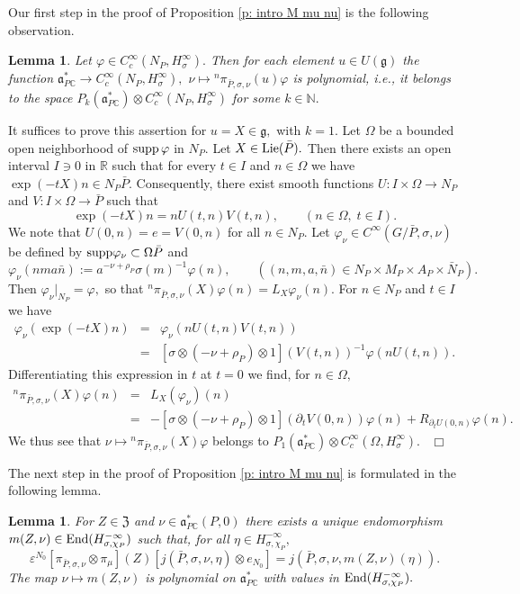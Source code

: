 \documentclass[12pt,a4paper]{article}
\newtheorem{Lemma}[Thm]{Lemma}
\newenvironment{lemma}[0]{\begin{Lemma}\noindent}%
{\end{Lemma}}
\def\proof{\par\noindent{\it Proof.}{\ }{\ }}
\def\qed{~\hfill\hbox{$\Box$}\medbreak}
\def\qquad{\quad\quad}
\def\msy#1{{\mathbb #1}}
\def\C{{\msy C}}
\def\N{{\msy N}}
\def\R{{\msy R}}
\def\ge{\varepsilon}
\def\gf{\varphi}
\def\gs{\sigma}
\def\got#1{\mathfrak #1}
\def\fa{{\got a}}
\def\fg{{\got g}}
\def\to{\rightarrow}
\def\End{{\rm End}}
\def\iC{{\scriptscriptstyle \C}}
\numberwithin{Thm}{section}
\numberwithin{equation}{section}
\def\supp{{\rm supp}}
\def\fZ{{\mathfrak Z}}
\def\faPdc{{\fa_{P\iC}^*}}
\numberwithin{equation}{section}
\def\fZ{{\mathfrak Z}}
\def\faPdc{\fa_{P\iC}^*}
\def\cchi{\chi}
\begin{document}
Our first step in the proof of Proposition \ref{p: intro M mu nu} is the following observation.
\begin{lemma}
\label{l: pol dep for Ccinfty}
Let $\gf \in C_c^\infty(N_P, H_\gs^\infty).$ Then for  each element $u \in U(\fg)$ the function $\faPdc \to C^\infty_c(N_P, H_\gs^\infty),$ 
$\nu \mapsto  {}^n \pi_{\bar P, \gs, \nu}(u) \gf$ is polynomial, i.e., it belongs to the space
$P_k(\faPdc) \otimes C^\infty_c(N_P, H_\gs^\infty)$ for some $k \in \N.$ 
\end{lemma}
\proof
It suffices to prove this assertion for $u = X  \in \fg,$ with $k=1.$ 
Let $\Omega $ be a bounded open neighborhood of $\supp\, \gf$ in $N_P.$ 
Let $X \in {\rm Lie}(\bar P).$ Then there exists an open interval $I \ni 0$ in $\R$ 
such that for every $t \in I$ and $n \in \Omega$ we have $ \exp (-tX)n  \in N_P \bar P.$ 
Consequently, there exist smooth functions $U: I\times \Omega \to N_P$ and 
$V: I\times \Omega \to \bar P$ 
such that
$$ 
\exp(-tX) n =  n U(t,n) V(t,n), \qquad (n \in \Omega,\; t \in I).
$$ 
%
We note that $U(0,n) = e = V(0,n)$ for all $n \in N_P.$ 
Let $\gf_\nu \in  C^\infty(G/\bar P, \gs, \nu)$ be defined by $\supp \gf_\nu \subset \Omega \bar P$ 
and 
$$ 
\gf_\nu(n m a\bar n) := a^{-\nu + \rho_P} \gs(m)^{-1} \gf(n),\qquad ((n, m, a, \bar n ) \in N_P \times M_P \times A_P \times\bar N_P).
$$
Then $\gf_\nu|_{N_P} = \gf,$ so that ${}^n \pi_{\bar P, \gs, \nu}(X) \gf(n) = L_X \gf_\nu(n).$ 
For $n \in N_P$ and $t \in I$ we have
\begin{eqnarray*} 
\gf_\nu(\exp (- tX) n) & = & \gf_\nu( n U(t,n) V(t,n)) \\
&=&  [\gs \otimes (-\nu + \rho_P) \otimes 1](V(t,n))^{-1} \gf(n U(t,n )).
\end{eqnarray*} 
Differentiating this expression in $t$ at $t =0$ we find, for $n \in \Omega,$
\begin{eqnarray*}
{}^n \pi_{\bar P, \gs, \nu}(X) \gf(n) &= &
L_X(\gf_\nu)(n) \\
& = & - [\gs \otimes (-\nu + \rho_P) \otimes 1](\partial_t V(0,n))\gf(n)
+ R_{\partial_t U(0,n)}\gf (n).
\end{eqnarray*} 
We thus see that $\nu \mapsto {}^n \pi_{\bar P, \gs, \nu}(X) \gf$ belongs to $P_1(\faPdc) \otimes C^\infty_c(\Omega, H_\gs^\infty).$ 
\qed

The next step in the proof of Proposition \ref{p: intro M mu nu} is formulated 
in the following lemma.

\begin{lemma}
\label{l: intro m Z nu}
For $Z \in \fZ$ and $\nu \in \faPdc(P,0)$ there exists 
a unique endomorphism $m(Z ,\nu) \in \End(H_{\gs,\cchi_P}^{-\infty})$ such that,
for all $\eta \in H_{\gs,\cchi_P}^{-\infty },$ 
\begin{equation}
\label{e: m Z mu}
\ge^{N_0} [\pi_{\bar P, \gs, \nu}  \otimes \pi_\mu](Z) [j(\bar P,\gs,\nu, \eta) \otimes e_{N_0}]  = 
j(\bar P,\gs,\nu ,m(Z, \nu)(\eta)).
\end{equation}
The map $\nu \mapsto m(Z, \nu)$ is polynomial on $\faPdc$ with values in $\End(H_{\gs,\cchi_P}^{-\infty}).$
\end{lemma}
\end{document}
